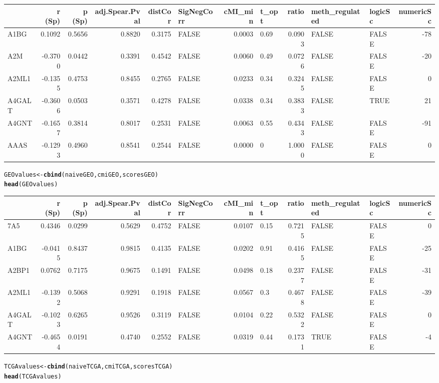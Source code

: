 \documentclass[a4paper,10pt]{article}\usepackage[]{graphicx}\usepackage[]{color}
\makeatletter
\newcommand{\hlstd}[1]{\textcolor[rgb]{0.345,0.345,0.345}{#1}}%
\newcommand{\hlkwb}[1]{\textcolor[rgb]{0.69,0.353,0.396}{#1}}%
\newcommand{\hlkwd}[1]{\textcolor[rgb]{0.737,0.353,0.396}{\textbf{#1}}}%
\newenvironment{kframe}{%
 \def\at@end@of@kframe{}%
 \ifinner\ifhmode%
  \def\at@end@of@kframe{\end{minipage}}%
  \begin{minipage}{\columnwidth}%
 \fi\fi%
 \def\FrameCommand##1{\hskip\@totalleftmargin \hskip-\fboxsep
 \colorbox{shadecolor}{##1}\hskip-\fboxsep
     \hskip-\linewidth \hskip-\@totalleftmargin \hskip\columnwidth}%
 \MakeFramed {\advance\hsize-\width
   \@totalleftmargin\z@ \linewidth\hsize
   \@setminipage}}%
 {\par\unskip\endMakeFramed%
 \at@end@of@kframe}
\newenvironment{knitrout}{}{} %
\makeatother
\begin{document}
\begin{knitrout}
\begin{tabular}{l|r|r|r|r|l|r|l|r|l|l|r}
\hline
  & r (Sp) & p (Sp) & adj.Spear.Pval & distCor & SigNegCorr & cMI\_min & t\_opt & ratio & meth\_regulated & logicSc & numericSc\\
\hline
A1BG & 0.1092 & 0.5656 & 0.8820 & 0.3175 & FALSE & 0.0003 & 0.69 & 0.0903 & FALSE & FALSE & -78\\
\hline
A2M & -0.3700 & 0.0442 & 0.3391 & 0.4542 & FALSE & 0.0060 & 0.49 & 0.0726 & FALSE & FALSE & -20\\
\hline
A2ML1 & -0.1355 & 0.4753 & 0.8455 & 0.2765 & FALSE & 0.0233 & 0.34 & 0.3245 & FALSE & FALSE & 0\\
\hline
A4GALT & -0.3606 & 0.0503 & 0.3571 & 0.4278 & FALSE & 0.0338 & 0.34 & 0.3833 & FALSE & TRUE & 21\\
\hline
A4GNT & -0.1657 & 0.3814 & 0.8017 & 0.2531 & FALSE & 0.0063 & 0.55 & 0.4343 & FALSE & FALSE & -91\\
\hline
AAAS & -0.1293 & 0.4960 & 0.8541 & 0.2544 & FALSE & 0.0000 & 0 & 1.0000 & FALSE & FALSE & 0\\
\hline
\end{tabular}\begin{kframe}\begin{alltt}
\hlstd{GEOvalues} \hlkwb{<-} \hlkwd{cbind}\hlstd{(naiveGEO, cmiGEO, scoresGEO)}
\hlkwd{head}\hlstd{(GEOvalues)}
\end{alltt}
\end{kframe}


\begin{tabular}{l|r|r|r|r|l|r|l|r|l|l|r}
\hline
  & r (Sp) & p (Sp) & adj.Spear.Pval & distCor & SigNegCorr & cMI\_min & t\_opt & ratio & meth\_regulated & logicSc & numericSc\\
\hline
7A5 & 0.4346 & 0.0299 & 0.5629 & 0.4752 & FALSE & 0.0107 & 0.15 & 0.7215 & FALSE & FALSE & 0\\
\hline
A1BG & -0.0415 & 0.8437 & 0.9815 & 0.4135 & FALSE & 0.0202 & 0.91 & 0.4165 & FALSE & FALSE & -25\\
\hline
A2BP1 & 0.0762 & 0.7175 & 0.9675 & 0.1491 & FALSE & 0.0498 & 0.18 & 0.2377 & FALSE & FALSE & -31\\
\hline
A2ML1 & -0.1392 & 0.5068 & 0.9291 & 0.1918 & FALSE & 0.0567 & 0.3 & 0.4678 & FALSE & FALSE & -39\\
\hline
A4GALT & -0.1023 & 0.6265 & 0.9526 & 0.3119 & FALSE & 0.0104 & 0.22 & 0.5322 & FALSE & FALSE & 0\\
\hline
A4GNT & -0.4654 & 0.0191 & 0.4740 & 0.2552 & FALSE & 0.0319 & 0.44 & 0.1731 & TRUE & FALSE & -4\\
\hline
\end{tabular}\begin{kframe}\begin{alltt}
\hlstd{TCGAvalues} \hlkwb{<-} \hlkwd{cbind}\hlstd{(naiveTCGA, cmiTCGA, scoresTCGA)}
\hlkwd{head}\hlstd{(TCGAvalues)}
\end{alltt}
\end{kframe}



\end{knitrout}
\end{document}
